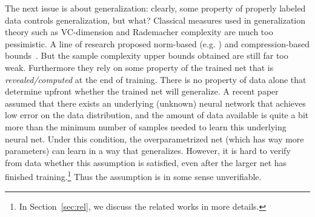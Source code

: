 The next issue is about generalization: clearly, some property of properly labeled data controls generalization, but what? 
Classical measures used in generalization theory such as VC-dimension and Rademacher complexity are much too pessimistic.
A line of research proposed norm-based (e.g. \cite{bartlett2017spectrally}) and compression-based bounds~\citep{arora2018stronger}.
But the sample complexity upper bounds obtained are still far too weak. 
Furthermore they rely on some property of the trained net that is \emph{revealed/computed} at the end of training. There is no property of data alone that determine upfront  whether the trained net will generalize.
A recent paper~\citep{allen2018learning} assumed that there exists an underlying (unknown) neural network that achieves low error on the data distribution,
and the amount of data available is quite a bit more than the minimum number of samples needed to learn this underlying neural net. Under this condition, the overparametrized net (which has way more parameters) can learn in a way that generalizes. However, it is hard to verify from data whether this assumption is satisfied, even after the larger net has finished training.\footnote{In Section~\ref{sec:rel}, we discuss the related works in more details.} Thus the assumption is in some sense unverifiable. 
 
